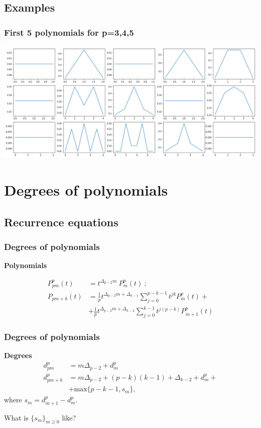 \subsection{Examples}
\begin{frame}
\frametitle{First 5 polynomials for p=3,4,5}
\includegraphics[width=\linewidth]{distributions}
\end{frame}

\section{Degrees of polynomials}
\subsection{Recurrence equations}
\begin{frame}
\frametitle{Degrees of polynomials}

\textbf{Polynomials}

\begin{align*} 
     P_{pm}^p(t) & =   t^{\Delta_{p-2} m}\ P_m^p(t)\ ; \\
     P_{pm+k}(t) & =   \frac{1}{p} t^{\Delta_{p-2} m + \Delta_{k-1}}\sum\limits_{j=0}^{p-k-1} t^{jk} P_m^p(t) + \\
     &  + \frac{1}{p} t^{\Delta_{p-2} m + \Delta_{k-2}}\sum\limits_{j=0}^{k-1} t^{j(p-k)} P_{m+1}^p(t) 
\end{align*}
\end{frame}

\begin{frame}
\frametitle{Degrees of polynomials}

\textbf{Degrees}
\begin{align*}
  d_{pm}^p &= m \Delta_{p-2} + d_m^p \\
  d_{pm+k}^p &= m \Delta_{p-2}+(p-k)(k-1)+\Delta_{k-2}+d_m^p+\\
   &+ \mathrm{max}\{p-k-1, s_m\},
\end{align*}
where $s_m = d_{m+1}^p-d_m^p$.

\begin{center}What is $\{s_m\}_{m \ge 0}$ like?\end{center}
\end{frame}

